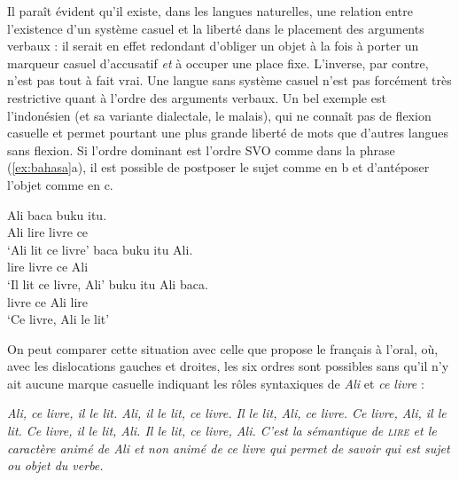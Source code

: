 {    \ea
    \z

    Il paraît évident qu’il existe, dans les langues naturelles, une relation entre l’existence d’un système casuel et la liberté dans le placement des arguments verbaux : il serait en effet redondant d’obliger un objet à la fois à porter un marqueur casuel d’accusatif \textit{et} à occuper une place fixe. L’inverse, par contre, n’est pas tout à fait vrai. Une langue sans système casuel n’est pas forcément très restrictive quant à l’ordre des arguments verbaux. Un bel exemple est l'indonésien (et sa variante dialectale, le malais), qui ne connaît pas de flexion casuelle et permet pourtant une plus grande liberté de mots que d’autres langues sans flexion. Si l’ordre dominant est l’ordre SVO comme dans la phrase (\ref{ex:bahasa}a), il est possible de postposer le sujet comme en b et d’antéposer l’objet comme en c.
    
    \ea\label{ex:bahasa}
    \ea
    \gll Ali baca buku itu.\\
    Ali lire    livre  ce\\
    \glt  ‘Ali lit ce livre’
    \ex
    \gll baca buku itu Ali.\\
    lire    livre  ce Ali\\
    \glt  ‘Il lit ce livre, Ali’
    \ex
    \gll buku itu Ali baca.\\
        livre ce Ali lire    \\
    \glt  ‘Ce livre, Ali le lit’
    \z
    \z

    On peut comparer cette situation avec celle que propose le français à l’oral, où, avec les dislocations gauches et droites, les six ordres sont possibles sans qu’il n’y ait aucune marque casuelle indiquant les rôles syntaxiques de \textit{Ali} et \textit{ce livre} :

    \ea
    \ea\itshape {Ali, ce livre, il le lit.}
    \ex\itshape {Ali, il le lit, ce livre.}
    \ex\itshape {Il le lit, Ali, ce livre.}
    \ex\itshape {Ce livre, Ali, il le lit.}
    \ex\itshape {Ce livre, il le lit, Ali.}
    \ex\itshape {Il le lit, ce livre, Ali.}
    \z
    \z
C'est la sémantique de \textsc{lire} et le caractère animé de \textit{Ali} et non animé de \textit{ce livre} qui permet de savoir qui est sujet ou objet du verbe.
}
